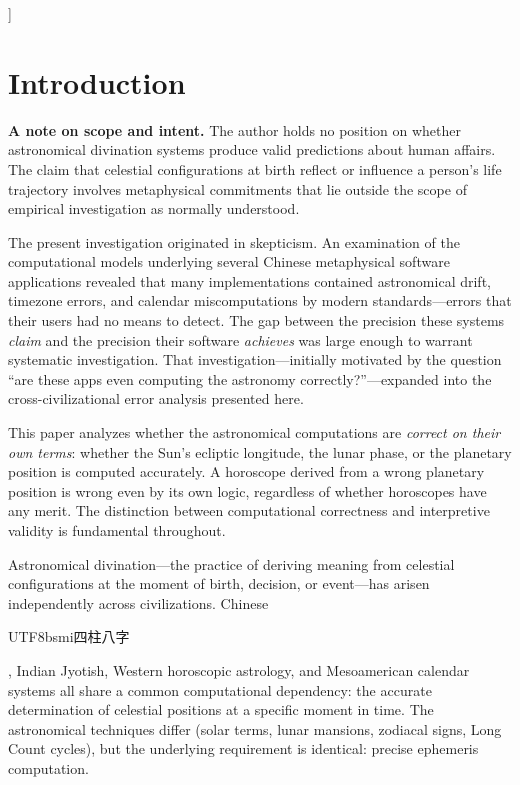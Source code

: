 \documentclass[10pt,a4paper]{article}
\newcommand{\zh}[1]{\begin{CJK}{UTF8}{bsmi}#1\end{CJK}}
\begin{document}
\vspace{1em}
]



\section{Introduction}
\label{sec:intro}

\begin{mdframed}[
  linecolor=black!40,
  backgroundcolor=black!3,
  roundcorner=4pt,
  linewidth=0.5pt,
  innertopmargin=8pt,
  innerbottommargin=8pt,
]
\small\noindent\textbf{A note on scope and intent.}
The author holds no position on whether astronomical divination
systems produce valid predictions about human affairs.  The claim
that celestial configurations at birth reflect or influence a
person's life trajectory involves metaphysical commitments that
lie outside the scope of empirical investigation as normally
understood.

The present investigation originated in skepticism.  An examination
of the computational models underlying several Chinese metaphysical
software applications revealed that many implementations contained
astronomical drift, timezone errors, and calendar miscomputations
by modern standards---errors that their users had no means to detect.
The gap between the precision these systems \emph{claim} and the
precision their software \emph{achieves} was large enough to
warrant systematic investigation.  That investigation---initially
motivated by the question ``are these apps even computing the
astronomy correctly?''---expanded into the cross-civilizational
error analysis presented here.

This paper analyzes whether the astronomical computations are
\emph{correct on their own terms}: whether the Sun's ecliptic
longitude, the lunar phase, or the planetary position is computed
accurately.  A horoscope derived from a wrong planetary position
is wrong even by its own logic, regardless of whether horoscopes
have any merit.  The distinction between computational correctness
and interpretive validity is fundamental throughout.
\end{mdframed}

\medskip

Astronomical divination---the practice of deriving meaning from
celestial configurations at the moment of birth, decision, or
event---has arisen independently across civilizations.  Chinese
\zh{四柱八字}, Indian Jyotish, Western horoscopic astrology, and
Mesoamerican calendar systems all share a common computational
dependency: the accurate determination of celestial positions at a
specific moment in time.  The astronomical techniques differ (solar
terms, lunar mansions, zodiacal signs, Long Count cycles), but the
underlying requirement is identical: precise ephemeris computation.
\end{document}
